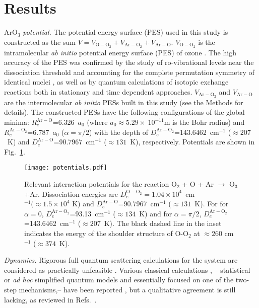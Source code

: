\documentclass[aps,prl,twocolumn,showpacs,preprintnumbers,amsmath,amssymb,floatfix]{revtex4-2}
\begin{document}
\section{Results}
{ArO$_3$ \it potential.}
The potential energy surface (PES) used in this study is constructed as the sum $V=V_\mathrm{O-O_2}+V_\mathrm{Ar-O_2}+V_\mathrm{Ar-O}$. $V_\mathrm{O-O_2}$  is the intramolecular {\it ab initio} potential energy surface (PES) of ozone \cite{TYU13:134307}.  The high accuracy of the PES was confirmed by the study of ro-vibrational levels near the dissociation threshold \cite{TYU14:143002} and accounting for the complete permutation symmetry of identical nuclei \cite{O3_PCCP,valijch2020}, as well as by quantum calculations of isotopic exchange reactions both in stationary \cite{HON18:214304} and time dependent \cite{YUE19:7733} approaches. $V_\mathrm{Ar-O_2}$ and $V_\mathrm{Ar-O}$ are the intermolecular {\it ab initio} PESs built in this study (see the Methods for details). The constructed PESs have the following configurations of the global minima:  $R_e^\mathrm{Ar-O}$=6.326~$a_0$ (where $a_0 \approx 5.29\times~10^{-11}$m is the Bohr radius) and $R_e^\mathrm{Ar-O_2}$=6.787~$a_0$ ($\alpha= \pi/2$) with the depth of $D_e^\mathrm{Ar-O_2}$=143.6462~cm$^{-1}$ ($\approx 207$~K) and $D_e^\mathrm{Ar-O}$=90.7967~cm$^{-1}$ ($\approx 131$~K), respectively. Potentials are shown in Fig.~\ref{fig:pots}.  
 
 
\begin{figure}
\centering
\texttt{[image: potentials.pdf]}
\caption{Relevant interaction potentials for the reaction O$_2$ + O + Ar $\rightarrow$ O$_3$ +Ar. Dissociation energies are $D_e^{\mathrm{O}-\mathrm{O}_2}= 1.04 \times 10^4$~cm$^{-1}(\approx 1.5 \times 10^4$ K) and $D_e^\mathrm{Ar-O}$=90.7967~cm$^{-1}$ ($\approx 131$~K). For for $\alpha= 0$, $D_e^\mathrm{Ar-O_2}$=93.13~cm$^{-1}$ ($\approx 134$~K) and for $\alpha= \pi/2$,
$D_e^\mathrm{Ar-O_2}$=143.6462~cm$^{-1}$ ($\approx 207$~K). The black dashed line in the inset indicates the energy of the shoulder structure of O-O$_2$ at $\approx 260$ cm$^{-1}$ ($\approx 374$~K).}
\label{fig:pots}
\end{figure}


{\it Dynamics.}
Rigorous full quantum scattering calculations for the system are considered as practically unfeasible \cite{SCH06:625,TEP16:19194}. Various classical calculations \cite{schinke2005,ivanov2006}, -- statistical  \cite{GAO01:259} or {\it ad hoc} simplified quantum models and essentially focused on one of the two-step mechanisms,-- have been reported \cite{CHA04:2700,XIE05:131,GRE09:181103,TEP18:259}, but a qualitative agreement is still lacking, as reviewed in Refs.~\cite{SCH06:625,TEP16:19194}.
\end{document}

